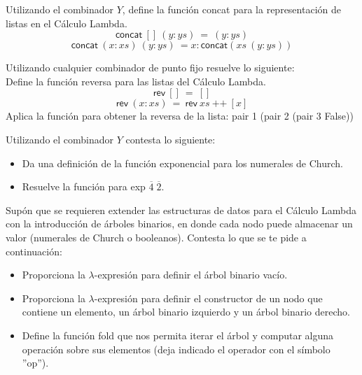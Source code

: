                 \begin{exercise}
                    Utilizando el combinador $Y$, define la función \textsf{concat} para la representación de listas en el Cálculo Lambda.
                    \[
                        \textsf{concat}\ []\ (y:ys)\ =\ (y:ys)
                    \]
                    \[
                        \textsf{concat}\ (x:xs)\ (y:ys)\ = x:\textsf{concat}(xs\ (y:ys))
                    \]
                \end{exercise}



                \begin{exercise}
                    Utilizando cualquier combinador de punto fijo resuelve lo siguiente:\\
                    
                    Define la función reversa para las listas del Cálculo Lambda. \\
                    \[
                        \textsf{rev}\ []\ =\ []
                    \]
                    \[
                        \textsf{rev}\ (x:xs)\ =\ \textsf{rev}\ xs\ \text{++}\ [x]
                    \]
                    Aplica la función para obtener la reversa de la lista: \textsf{pair 1 (pair 2 (pair 3 False))}
                \end{exercise}



                \begin{exercise}
                    Utilizando el combinador $Y$ contesta lo siguiente: \\
                    \begin{itemize}
                    	\item Da una definición de la función exponencial para los numerales de Church.
                    	\item Resuelve la función para \textsf{exp} $\overline{4} \; \overline{2}$.
		    \end{itemize}
                \end{exercise}


		\begin{exercise}
			Supón que se requieren extender las estructuras de datos para el Cálculo Lambda con la introducción de árboles binarios, en donde cada nodo puede almacenar un valor (numerales de Church o booleanos). Contesta lo que se te pide a continuación:\\
			\begin{itemize}
				\item Proporciona la $\lambda$-expresión para definir el árbol binario vacío.
				\item Proporciona la $\lambda$-expresión para definir el constructor de un nodo que contiene un elemento, un árbol binario izquierdo y un árbol binario derecho.
				\item Define la función \textsf{fold} que nos permita iterar el árbol y computar alguna operación sobre sus elementos (deja indicado el operador con el símbolo ''op'').
			\end{itemize}
		\end{exercise}




